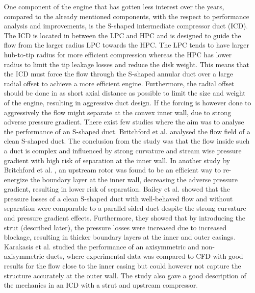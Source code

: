 One component of the engine that has gotten less interest over the years, compared to the already mentioned components, with the respect to performance analysis and improvements, is the S-shaped intermediate compressor duct (ICD). The ICD is located in between the LPC and HPC and is designed to guide the flow from the larger radius LPC towards the HPC. The LPC tends to have larger hub-to-tip radius for more efficient compression whereas the HPC has lower radius to limit the tip leakage losses and reduce the disk weight. This means that the ICD must force the flow through the S-shaped annular duct over a large radial offset to achieve a more efficient engine. Furthermore, the radial offset should be done in as short axial distance as possible to limit the size and weight of the engine, resulting in aggressive duct design. If the forcing is however done to aggressively the flow might separate at the convex inner wall, due to strong adverse pressure gradient. There exist few studies where the aim was to analyse the performance of an S-shaped duct. Britchford et al. \cite{Britchford1994} analysed the flow field of a clean S-shaped duct. The conclusion from the study was that the flow inside such a duct is complex and influenced by strong curvature and stream wise pressure gradient with high risk of separation at the inner wall. In another study by Britchford et al. \cite{Britchford1994b}, an upstream rotor was found to be an efficient way to re-energize the boundary layer at the inner wall, decreasing the adverse pressure gradient, resulting in lower risk of separation. Bailey et al. \cite{Bailey} showed that the pressure losses of a clean S-shaped duct with well-behaved flow and without separation were comparable to a parallel sided duct despite the strong curvature and pressure gradient effects. Furthermore, they showed that by introducing the strut (described later), the pressure losses were increased due to increased blockage, resulting in thicker boundary layers at the inner and outer casings. Karakasis et al. \cite{Karakasis2010} studied the performance of an axisymmetric and non-axisymmetric ducts, where experimental data was compared to CFD with good results for the flow close to the inner casing but could however not capture the structure accurately at the outer wall. The study also gave a good description of the mechanics in an ICD with a strut and upstream compressor.

